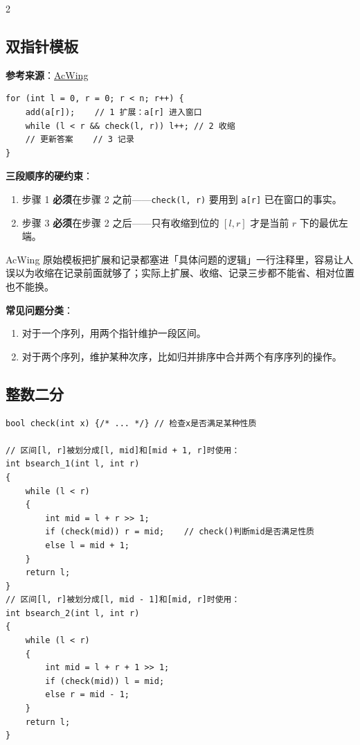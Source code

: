 \begin{multicols*}{2}
		\subsection{双指针模板}

		\textbf{参考来源}：\href{https://www.acwing.com/}{AcWing}

		\begin{verbatim}
for (int l = 0, r = 0; r < n; r++) {
    add(a[r]);    // 1 扩展：a[r] 进入窗口
    while (l < r && check(l, r)) l++; // 2 收缩
    // 更新答案    // 3 记录
}
		\end{verbatim}

		\textbf{三段顺序的硬约束}：

		\begin{enumerate}
			\item 步骤 1 \textbf{必须}在步骤 2 之前——\texttt{check(l, r)} 要用到 \texttt{a[r]} 已在窗口的事实。
			\item 步骤 3 \textbf{必须}在步骤 2 之后——只有收缩到位的 $[l, r]$ 才是当前 $r$ 下的最优左端。
		\end{enumerate}

		AcWing 原始模板把扩展和记录都塞进「具体问题的逻辑」一行注释里，容易让人误以为收缩在记录前面就够了；实际上扩展、收缩、记录三步都不能省、相对位置也不能换。

		\textbf{常见问题分类}：

		\begin{enumerate}
			\item 对于一个序列，用两个指针维护一段区间。
			\item 对于两个序列，维护某种次序，比如归并排序中合并两个有序序列的操作。
		\end{enumerate}

		\subsection{整数二分}

		\begin{verbatim}
bool check(int x) {/* ... */} // 检查x是否满足某种性质

// 区间[l, r]被划分成[l, mid]和[mid + 1, r]时使用：
int bsearch_1(int l, int r)
{
    while (l < r)
    {
        int mid = l + r >> 1;
        if (check(mid)) r = mid;    // check()判断mid是否满足性质
        else l = mid + 1;
    }
    return l;
}
// 区间[l, r]被划分成[l, mid - 1]和[mid, r]时使用：
int bsearch_2(int l, int r)
{
    while (l < r)
    {
        int mid = l + r + 1 >> 1;
        if (check(mid)) l = mid;
        else r = mid - 1;
    }
    return l;
}
		\end{verbatim}


\end{multicols*}
